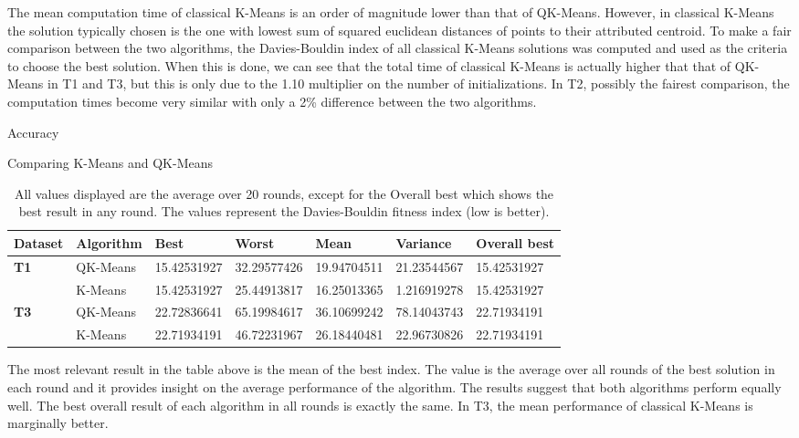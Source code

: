 \documentclass[10pt,a4paper,final]{article}
\begin{document}
The mean computation time of classical K-Means is an order of magnitude lower than that of QK-Means. However, in classical K-Means the solution typically chosen is the one with lowest sum of squared euclidean distances of points to their attributed centroid. To make a fair comparison between the two algorithms, the Davies-Bouldin index of all classical K-Means solutions was computed and used as the criteria to choose the best solution. When this is done, we can see that the total time of classical K-Means is actually higher that that of QK-Means in T1 and T3, but this is only due to the 1.10 multiplier on the number of initializations. In T2, possibly the fairest comparison, the computation times become very similar with only a 2\% difference between the two algorithms.

Accuracy

Comparing K-Means and QK-Means


\begin{table}[h]
\caption{All values displayed are the average over 20 rounds, except for the Overall best which shows the best result in any round. The values represent the Davies-Bouldin fitness index (low is better).}
\begin{tabular}{|l|l|l|l|l|l|l|}
\hline
\textbf{Dataset} & \textbf{Algorithm} & \textbf{Best} & \textbf{Worst} & \textbf{Mean} & \textbf{Variance} & \textbf{Overall best} \\ \hline
\textbf{T1}      & QK-Means           & 15.42531927   & 32.29577426    & 19.94704511   & 21.23544567       & 15.42531927           \\ \cline{2-7} 
\textbf{}        & K-Means            & 15.42531927   & 25.44913817    & 16.25013365   & 1.216919278       & 15.42531927           \\ \hline
\textbf{T3}      & QK-Means           & 22.72836641   & 65.19984617    & 36.10699242   & 78.14043743       & 22.71934191           \\ \cline{2-7} 
\textbf{}        & K-Means            & 22.71934191   & 46.72231967    & 26.18440481   & 22.96730826       & 22.71934191           \\ \hline
\end{tabular}
\end{table}

The most relevant result in the table above is the mean of the best index. The value is the average over all rounds of the best solution in each round and it provides insight on the average performance of the algorithm. The results suggest that both algorithms perform equally well. The best overall result of each algorithm in all rounds is exactly the same. In T3, the mean performance of classical K-Means is marginally better.
\end{document}
